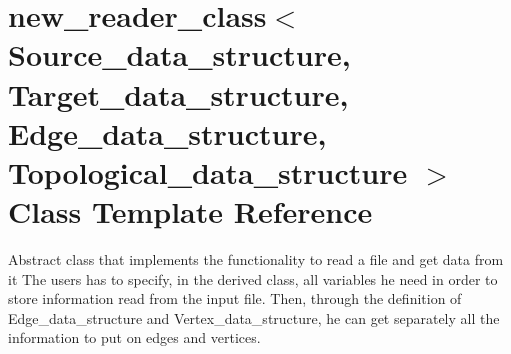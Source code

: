 \hypertarget{classnew__reader__class}{
\section{new\_\-reader\_\-class$<$ Source\_\-data\_\-structure, Target\_\-data\_\-structure, Edge\_\-data\_\-structure, Topological\_\-data\_\-structure $>$ Class Template Reference}
\label{classnew__reader__class}
}


Abstract class that implements the functionality to read a file and get data from it  The users has to specify, in the derived class, all variables he need in order to store information read from the input file. Then, through the definition of Edge\_\-data\_\-structure and Vertex\_\-data\_\-structure, he can get separately all the information to put on edges and vertices.  



